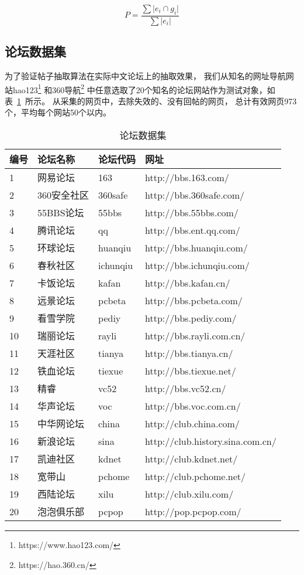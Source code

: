 \begin{equation}
P = \frac{\sum \vert e_i \cap g_i \vert}{\sum \vert e_i \vert}
\end{equation}

\subsection{论坛数据集}
为了验证帖子抽取算法在实际中文论坛上的抽取效果，
我们从知名的网址导航网站hao123\footnote{https://www.hao123.com/}
和360导航\footnote{https://hao.360.cn/}
中任意选取了20个知名的论坛网站作为测试对象，如表~\ref{tbl:forum-dataset}~所示。
从采集的网页中，去除失效的、没有回帖的网页，
总计有效网页973个，平均每个网站50个以内。

\begin{table}[t]
\caption{论坛数据集}
\label{tbl:forum-dataset}
\vspace{0.5em}\centering\wuhao
\begin{tabular}{llll}
\toprule[1.5pt]
编号 & 论坛名称 & 论坛代码 & 网址 \\
\midrule[1pt]
1 & 网易论坛 & 163 & http://bbs.163.com/ \\
2 & 360安全社区 & 360safe & http://bbs.360safe.com/ \\
3 & 55BBS论坛 & 55bbs & http://bbs.55bbs.com/ \\
4 & 腾讯论坛 & qq & http://bbs.ent.qq.com/ \\
5 & 环球论坛 & huanqiu & http://bbs.huanqiu.com/ \\
6 & 春秋社区 & ichunqiu & http://bbs.ichunqiu.com/ \\
7 & 卡饭论坛 & kafan & http://bbs.kafan.cn/ \\
8 & 远景论坛 & pcbeta & http://bbs.pcbeta.com/ \\
9 & 看雪学院 & pediy & http://bbs.pediy.com/ \\
10 & 瑞丽论坛 & rayli & http://bbs.rayli.com.cn/ \\
11 & 天涯社区 & tianya & http://bbs.tianya.cn/ \\
12 & 铁血论坛 & tiexue & http://bbs.tiexue.net/ \\
13 & 精睿 & vc52 & http://bbs.vc52.cn/ \\
14 & 华声论坛 & voc & http://bbs.voc.com.cn/ \\
15 & 中华网论坛 & china & http://club.china.com/ \\
16 & 新浪论坛 & sina & http://club.history.sina.com.cn/ \\
17 & 凯迪社区 & kdnet & http://club.kdnet.net/ \\
18 & 宽带山 & pchome & http://club.pchome.net/ \\
19 & 西陆论坛 & xilu & http://club.xilu.com/ \\
20 & 泡泡俱乐部 & pcpop & http://pop.pcpop.com/ \\
\bottomrule[1.5pt]
\end{tabular}
\end{table}

